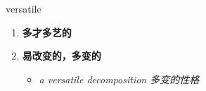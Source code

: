 
\begin{frame}
{\huge versatile}
\begin{center}
\begin{enumerate}\Large
  \item \textbf{多才多艺的}
  \item \textbf{易改变的，多变的}
  \begin{itemize}
    \item \em{\Large{a versatile decomposition 多变的性格}}
  \end{itemize}
\end{enumerate}
\end{center}
\end{frame}
